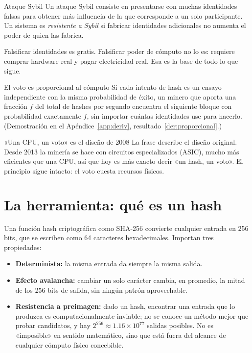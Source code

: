 \documentclass[11pt,a4paper]{article}
\newcommand{\webhint}[1]{}
\begin{document}
\begin{definicion}{Ataque Sybil}\label{def:sybil}
Un ataque Sybil consiste en presentarse con muchas identidades falsas para obtener más influencia de la que corresponde a un solo participante. Un sistema es \emph{resistente a Sybil} si fabricar identidades adicionales no aumenta el poder de quien las fabrica.
\end{definicion}

Falsificar identidades es gratis. Falsificar poder de cómputo no lo es: requiere comprar hardware real y pagar electricidad real. Esa es la base de todo lo que sigue.

\begin{resultado}{El voto es proporcional al cómputo}\label{res:proporcional}
Si cada intento de hash es un ensayo independiente con la misma probabilidad de éxito, un minero que aporta una fracción $f$ del total de hashes por segundo encuentra el siguiente bloque con probabilidad exactamente $f$, sin importar cuántas identidades use para hacerlo. (Demostración en el Apéndice~\ref{app:deriv}, resultado~\ref{der:proporcional}.)
\end{resultado}

\begin{cuidado}{«Una CPU, un voto» es el diseño de 2008}
La frase describe el diseño original. Desde 2013 la minería se hace con circuitos especializados (ASIC), mucho más eficientes que una CPU, así que hoy es más exacto decir «un hash, un voto». El principio sigue intacto: el voto cuesta recursos físicos.
\end{cuidado}

\section{La herramienta: qué es un hash}\label{sec:hash}
\webhint{section; id=sec-hash; slug=que-es-un-hash; kicker=04 — la herramienta; role=narrative+widget}

Una función hash criptográfica como SHA-256 convierte cualquier entrada en 256 bits, que se escriben como 64 caracteres hexadecimales. Importan tres propiedades:

\begin{itemize}[leftmargin=1.4em,itemsep=2pt]
  \item \textbf{Determinista:} la misma entrada da siempre la misma salida.
  \item \textbf{Efecto avalancha:} cambiar un solo carácter cambia, en promedio, la mitad de los 256 bits de salida, sin ningún patrón aprovechable.
  \item \textbf{Resistencia a preimagen:} dado un hash, encontrar una entrada que lo produzca es computacionalmente inviable; no se conoce un método mejor que probar candidatos, y hay $2^{256}\approx 1.16\times 10^{77}$ salidas posibles. No es «imposible» en sentido matemático, sino que está fuera del alcance de cualquier cómputo físico concebible.
\end{itemize}
\end{document}
